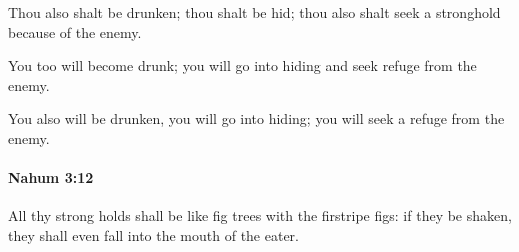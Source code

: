 			\begin{versebox}
					\item[BHS] 
					\item[LXX] 
					\item[ASV] Thou also shalt be drunken; thou shalt be hid; thou also shalt seek a stronghold because of the enemy.
					\item[NIV] You too will become drunk; you will go into hiding and seek refuge from the enemy.
					\item[NRSV] You also will be drunken, you will go into hiding; you will seek a refuge from the enemy.
			\end{versebox}

		\paragraph{Nahum 3:12} %
			\label{NAHUM-3-12}

			All thy strong holds shall be like fig trees with the firstripe figs: if they be shaken, they shall even fall into the mouth of the eater.

